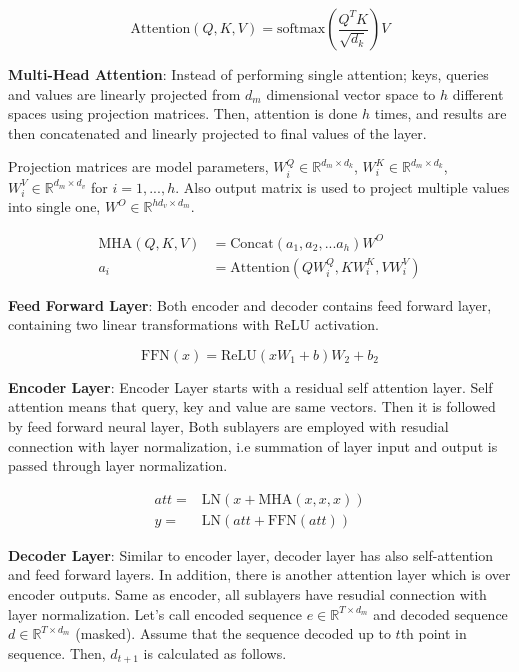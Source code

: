 \begin{equation}
\mathrm{Attention}(Q, K, V) = \mathrm{softmax}(\frac{Q^{T} K}{\sqrt{d_k}}) V
\end{equation}

\textbf{Multi-Head Attention}: Instead of performing single attention; keys, queries and values are linearly projected from $d_m$ dimensional vector space to $h$ different spaces using projection matrices. Then, attention is done $h$ times, and results are then concatenated and linearly projected to final values of the layer.

Projection matrices are model parameters, $W^Q_i \in \mathbb{R}^{d_m \times d_k}$, $W^K_i \in \mathbb{R}^{d_m \times d_k}$, $W^V_i \in \mathbb{R}^{d_m \times d_v}$ for $i=1,...,h$. Also output matrix is used to project multiple values into single one, $W^O \in \mathbb{R}^{h d_v \times d_m}$.

\begin{equation}
\begin{split}
\mathrm{MHA}(Q,K,V) &=  \text{Concat}(a_1, a_2, ... a_h)W^O \\
a_i &=  \text{Attention}(QW^Q_i,KW^K_i,VW^V_i)
\end{split}
\end{equation}

\textbf{Feed Forward Layer}: Both encoder and decoder contains feed forward layer, containing two linear transformations with ReLU activation.

\begin{equation}
\mathrm{FFN}(x) = \text{ReLU}(xW_1+b)W_2+b_2
\end{equation}



\textbf{Encoder Layer}: Encoder Layer starts with a residual self attention layer. Self attention means that query, key and value are same vectors. Then it is followed by feed forward neural layer, Both sublayers are employed with resudial connection with layer normalization, i.e summation of layer input and output is passed through layer normalization.

\begin{equation}
\begin{split}
att = & \mathrm{LN}(x+ \mathrm{MHA}(x,x,x)) \\
y = & \mathrm{LN}(att+ \mathrm{FFN}(att))
\end{split}
\end{equation}

\textbf{Decoder Layer}: Similar to encoder layer, decoder layer has also self-attention and feed forward layers. In addition, there is another attention layer which is over encoder outputs. Same as encoder, all sublayers have resudial connection with layer normalization. Let's call encoded sequence $e \in \mathbb{R}^{T \times d_m}$ and decoded sequence $d \in \mathbb{R}^{T \times d_m}$ (masked). Assume that the sequence decoded up to $t$th point in sequence. Then, $d_{t+1}$ is calculated as follows.

